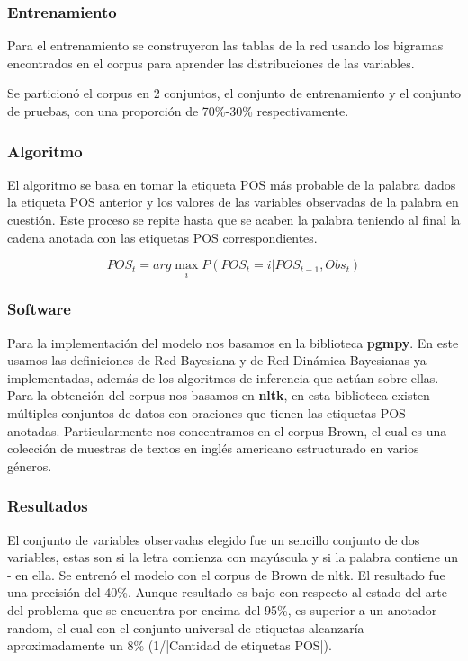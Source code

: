 \documentclass[]{article}
\begin{document}
\subsubsection{Entrenamiento}\label{header-n140}

Para el entrenamiento se construyeron las tablas de la red usando los
bigramas encontrados en el corpus para aprender las distribuciones de
las variables.

Se particionó el corpus en 2 conjuntos, el conjunto de entrenamiento y
el conjunto de pruebas, con una proporción de 70\%-30\% respectivamente.

\subsubsection{Algoritmo}\label{header-n143}

El algoritmo se basa en tomar la etiqueta POS más probable de la palabra
dados la etiqueta POS anterior y los valores de las variables observadas
de la palabra en cuestión. Este proceso se repite hasta que se acaben la
palabra teniendo al final la cadena anotada con las etiquetas POS
correspondientes.

$$POS_t = arg \max_i P(POS_t = i | POS_{t-1}, Obs_t)$$

\subsubsection{Software}\label{header-n146}

Para la implementación del modelo nos basamos en la biblioteca
\textbf{pgmpy}. En este usamos las definiciones de Red Bayesiana y de
Red Dinámica Bayesianas ya implementadas, además de los algoritmos de
inferencia que actúan sobre ellas. Para la obtención del corpus nos
basamos en \textbf{nltk}, en esta biblioteca existen múltiples conjuntos
de datos con oraciones que tienen las etiquetas POS anotadas.
Particularmente nos concentramos en el corpus Brown, el cual es una
colección de muestras de textos en inglés americano estructurado en
varios géneros.

\subsubsection{Resultados}\label{header-n148}

El conjunto de variables observadas elegido fue un sencillo conjunto de
dos variables, estas son si la letra comienza con mayúscula y si la
palabra contiene un - en ella. Se entrenó el modelo con el corpus de
Brown de nltk. El resultado fue una precisión del 40\%. Aunque resultado
es bajo con respecto al estado del arte del problema que se encuentra
por encima del 95\%, es superior a un anotador random, el cual con el
conjunto universal de etiquetas alcanzaría aproximadamente un 8\%
(1/|Cantidad de etiquetas POS|).
\end{document}
